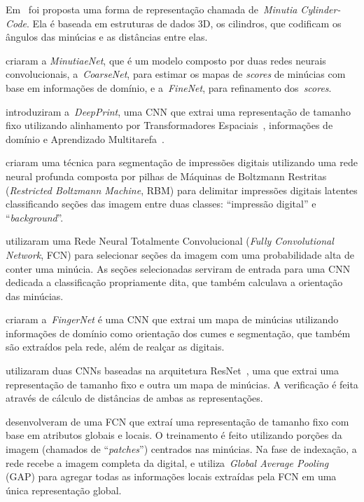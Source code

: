 Em~\cite{mcc} foi proposta uma forma de representação chamada de~\textit{Minutia Cylinder-Code}. Ela é baseada em estruturas de dados 3D, os cilindros, que codificam os ângulos das minúcias e as distâncias entre elas.

 criaram a \textit{MinutiaeNet}, que é um modelo composto por duas redes neurais convolucionais, a~\textit{CoarseNet}, para estimar os mapas de \textit{scores} de minúcias com base em informações de domínio, e a~\textit{FineNet}, para refinamento dos~\textit{scores}.

 introduziram a~\textit{DeepPrint}, uma CNN que extrai uma representação de tamanho fixo utilizando alinhamento por Transformadores Espaciais~\cite{spatial-transformer-networks}, informações de domínio e Aprendizado Multitarefa~\cite{multitask-learning}.

 criaram uma técnica para segmentação de impressões digitais utilizando uma rede neural profunda composta por pilhas de Máquinas de Boltzmann Restritas (\textit{Restricted Boltzmann Machine}, RBM) para delimitar impressões digitais latentes classificando seções das imagem entre duas classes: ``impressão digital'' e ``\textit{background}''. 

 utilizaram uma Rede Neural Totalmente Convolucional (\textit{Fully Convolutional Network}, FCN) para selecionar seções da imagem com uma probabilidade alta de conter uma minúcia. As seções selecionadas serviram de entrada para uma CNN dedicada a classificação propriamente dita, que também calculava a orientação das minúcias.

 criaram a~\textit{FingerNet} é uma CNN que extrai um mapa de minúcias utilizando informações de domínio como orientação dos cumes e segmentação, que também são extraídos pela rede, além de realçar as digitais.

 utilizaram duas CNNs baseadas na arquitetura ResNet~\cite{inception-v4}, uma que extrai uma representação de tamanho fixo e outra um mapa de minúcias. A verificação é feita através de cálculo de distâncias de ambas as representações.

 desenvolveram de uma FCN que extraí uma representação de tamanho fixo com base em atributos globais e locais. O treinamento é feito utilizando porções da imagem (chamados de ``\textit{patches}'') centrados nas minúcias. Na fase de indexação, a rede recebe a imagem completa da digital, e utiliza~\textit{Global Average Pooling} (GAP) para agregar todas as informações locais extraídas pela FCN em uma única representação global.


